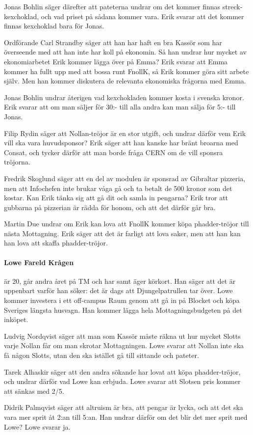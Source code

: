 \documentclass[hidelinks]{sektionsmote}
\begin{document}
Jonas Bohlin säger därefter att pateterna undrar om det kommer finnas streck-kexchoklad, och vad priset på sådana kommer vara.
Erik svarar att det kommer finnas kexchoklad bara för Jonas.\par
Ordförande Carl Strandby säger att han har haft en bra Kassör som har överseende med att han inte har koll på ekonomin.
Så han undrar hur mycket av ekonomiarbetet Erik kommer lägga över på Emma?
Erik svarar att Emma kommer ha fullt upp med att bossa runt FnollK, så Erik kommer göra sitt arbete själv.
Men han kommer diskutera de relevanta ekonomiska frågorna med Emma.\par
Jonas Bohlin undrar återigen vad kexchokladen kommer kosta i svenska kronor.
Erik svarar att om man säljer för 30:- till alla andra kan man sälja för 5:- till Jonas.\par
Filip Rydin säger att Nollan-tröjor är en stor utgift, och undrar därför vem Erik vill ska vara huvudsponsor?
Erik säger att han kanske har bränt broarna med Consat, och tycker därför att man borde fråga CERN om de vill sponsra tröjorna.\par
Fredrik Skoglund säger att en del av modulen är sponsrad av Gibraltar pizzeria, men att Infochefen inte brukar våga gå och ta betalt de 500 kronor som det kostar.
Kan Erik tänka sig att gå dit och samla in pengarna?
Erik tror att gubbarna på pizzerian är rädda för honom, och att det därför går bra.\par
Martin Due undrar om Erik kan lova att FnollK kommer köpa phadder-tröjor till nästa Mottagning.
Erik säger att det är farligt att lova saker, men att han kan han lova att skaffa phadder-tröjor.

\paragraph{Lowe Fareld Krågen} är 20, går andra året på TM och har samt äger körkort.
Han säger att det är uppenbart varför han söker: det är dags att Djungelpatrullen tar över.
Lowe kommer investera i ett off-campus Raum genom att gå in på Blocket och köpa Sveriges längsta husvagn.
Han kommer lägga hela Mottagningsbudgeten på det inköpet.\par
Ludvig Nordqvist säger att man som Kassör måste räkna ut hur mycket Slotts varje Nollan får om man skrotar Mottagningen.
Lowe svarar att Nollan inte ska få någon Slotts, utan den ska istället gå till sittande och pateter.\par
Tarek Alhaskir säger att den andra sökande har lovat att köpa phadder-tröjor, och undrar därför vad Lowe kan erbjuda.
Lowe svarar att Slotsen pris kommer att sänkas med 2/5.\par
Didrik Palmqvist säger att altruism är bra, att pengar är lycka, och att det ska vara mer sprit åt 2:an till 5:an.
Han undrar därför om det blir det mer sprit med Lowe?
Lowe svarar ja.
\end{document}
